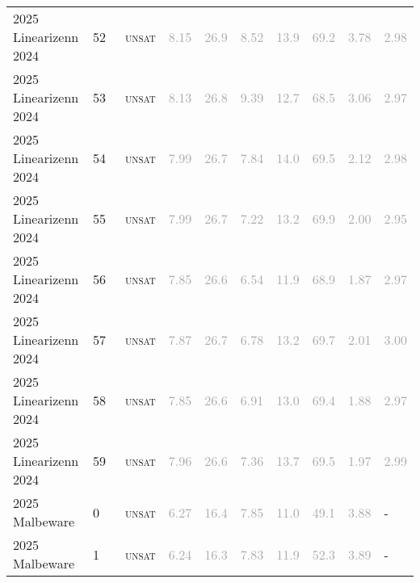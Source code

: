 \begin{center}
{\begin{longtable}{@{}llllllllll@{}}
2025 Linearizenn 2024 & 52 & ~\textsc{unsat} & \textcolor{darkgray}{8.15} & \textcolor{darkgray}{26.9} & \textcolor{darkgray}{8.52} & \textcolor{darkgray}{13.9} & \textcolor{darkgray}{69.2} & \textcolor{darkgray}{3.78} & \textcolor{darkgray}{2.98} \\
2025 Linearizenn 2024 & 53 & ~\textsc{unsat} & \textcolor{darkgray}{8.13} & \textcolor{darkgray}{26.8} & \textcolor{darkgray}{9.39} & \textcolor{darkgray}{12.7} & \textcolor{darkgray}{68.5} & \textcolor{darkgray}{3.06} & \textcolor{darkgray}{2.97} \\
2025 Linearizenn 2024 & 54 & ~\textsc{unsat} & \textcolor{darkgray}{7.99} & \textcolor{darkgray}{26.7} & \textcolor{darkgray}{7.84} & \textcolor{darkgray}{14.0} & \textcolor{darkgray}{69.5} & \textcolor{darkgray}{2.12} & \textcolor{darkgray}{2.98} \\
2025 Linearizenn 2024 & 55 & ~\textsc{unsat} & \textcolor{darkgray}{7.99} & \textcolor{darkgray}{26.7} & \textcolor{darkgray}{7.22} & \textcolor{darkgray}{13.2} & \textcolor{darkgray}{69.9} & \textcolor{darkgray}{2.00} & \textcolor{darkgray}{2.95} \\
2025 Linearizenn 2024 & 56 & ~\textsc{unsat} & \textcolor{darkgray}{7.85} & \textcolor{darkgray}{26.6} & \textcolor{darkgray}{6.54} & \textcolor{darkgray}{11.9} & \textcolor{darkgray}{68.9} & \textcolor{darkgray}{1.87} & \textcolor{darkgray}{2.97} \\
2025 Linearizenn 2024 & 57 & ~\textsc{unsat} & \textcolor{darkgray}{7.87} & \textcolor{darkgray}{26.7} & \textcolor{darkgray}{6.78} & \textcolor{darkgray}{13.2} & \textcolor{darkgray}{69.7} & \textcolor{darkgray}{2.01} & \textcolor{darkgray}{3.00} \\
2025 Linearizenn 2024 & 58 & ~\textsc{unsat} & \textcolor{darkgray}{7.85} & \textcolor{darkgray}{26.6} & \textcolor{darkgray}{6.91} & \textcolor{darkgray}{13.0} & \textcolor{darkgray}{69.4} & \textcolor{darkgray}{1.88} & \textcolor{darkgray}{2.97} \\
2025 Linearizenn 2024 & 59 & ~\textsc{unsat} & \textcolor{darkgray}{7.96} & \textcolor{darkgray}{26.6} & \textcolor{darkgray}{7.36} & \textcolor{darkgray}{13.7} & \textcolor{darkgray}{69.5} & \textcolor{darkgray}{1.97} & \textcolor{darkgray}{2.99} \\
\midrule
2025 Malbeware & 0 & ~\textsc{unsat} & \textcolor{darkgray}{6.27} & \textcolor{darkgray}{16.4} & \textcolor{darkgray}{7.85} & \textcolor{darkgray}{11.0} & \textcolor{darkgray}{49.1} & \textcolor{darkgray}{3.88} & - \\
2025 Malbeware & 1 & ~\textsc{unsat} & \textcolor{darkgray}{6.24} & \textcolor{darkgray}{16.3} & \textcolor{darkgray}{7.83} & \textcolor{darkgray}{11.9} & \textcolor{darkgray}{52.3} & \textcolor{darkgray}{3.89} & - \\

\end{longtable}}
\end{center}
